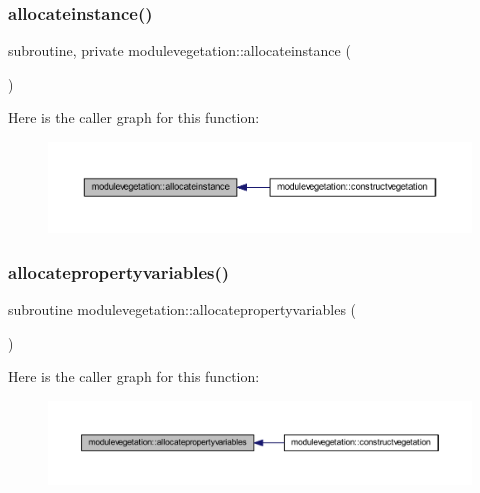 \subsubsection{\texorpdfstring{allocateinstance()}{allocateinstance()}}
{\footnotesize\ttfamily subroutine, private modulevegetation\+::allocateinstance (\begin{DoxyParamCaption}{ }\end{DoxyParamCaption})\hspace{0.3cm}{\ttfamily [private]}}

Here is the caller graph for this function\+:\nopagebreak
\begin{figure}[H]
\begin{center}
\leavevmode
\includegraphics[width=350pt]{namespacemodulevegetation_a1f6f35f8c49c08345fa70db3965f5763_icgraph}
\end{center}
\end{figure}
\mbox{\label{namespacemodulevegetation_a510aa5d26336e50f405ca27491ba7996}} 
\subsubsection{\texorpdfstring{allocatepropertyvariables()}{allocatepropertyvariables()}}
{\footnotesize\ttfamily subroutine modulevegetation\+::allocatepropertyvariables (\begin{DoxyParamCaption}{ }\end{DoxyParamCaption})\hspace{0.3cm}{\ttfamily [private]}}

Here is the caller graph for this function\+:\nopagebreak
\begin{figure}[H]
\begin{center}
\leavevmode
\includegraphics[width=350pt]{namespacemodulevegetation_a510aa5d26336e50f405ca27491ba7996_icgraph}
\end{center}
\end{figure}
\mbox{\label{namespacemodulevegetation_a676fd58a37b84d4c65395b662dd8f0c6}} 
